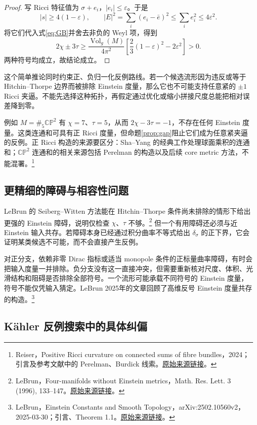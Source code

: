 \documentclass[11pt,a4paper]{article}
\theoremstyle{definition}
\newcommand{\Vol}{\operatorname{Vol}}
\newcommand{\src}[3]{\footnote{\raggedright #1，#2。\href{#3}{原始来源链接}。}}
\begin{document}
\begin{proof}
写 Ricci 特征值为 $\sigma+e_i$，$|e_i|\le\varepsilon$。于是
\[
|s|\ge4(1-\varepsilon),\qquad
|E|^2=\sum_i(e_i-\bar e)^2\le\sum_i e_i^2\le4\varepsilon^2.
\]
将它们代入式\eqref{eq:GB}并舍去非负的 Weyl 项，得到
\[
2\chi\pm3\tau\ge\frac{\Vol_g(M)}{4\pi^2}
\left[\frac23(1-\varepsilon)^2-2\varepsilon^2\right]>0.
\]
两种符号均成立，故结论成立。
\end{proof}

这个简单推论同时约束正、负归一化反例路线。若一个候选流形因为违反或等于 Hitchin--Thorpe 边界而被排除 Einstein 度量，那么它也不可能支持任意紧的 $\pm1$ Ricci 夹逼。不能先选择这种拓扑，再假定通过优化或缩小拼接尺度总能把相对误差降到零。

例如 $M=\#_5\mathbb{CP}^2$ 有 $\chi=7$、$\tau=5$，从而 $2\chi-3\tau=-1$，不存在任何 Einstein 度量。这类连通和可具有正 Ricci 度量，但命题\ref{prop:gap}阻止它们成为任意紧夹逼的反例。正 Ricci 构造的来源要区分：Sha--Yang 的经典工作处理球面乘积的连通和；$\mathbb{CP}^2$ 连通和的相关来源包括 Perelman 的构造以及后续 core metric 方法，不能混署。\src{Reiser}{Positive Ricci curvature on connected sums of fibre bundles，2024；引言及参考文献中的 Perelman、Burdick 线索}{https://arxiv.org/abs/2406.02274}

\subsection{更精细的障碍与相容性问题}

LeBrun 的 Seiberg--Witten 方法能在 Hitchin--Thorpe 条件尚未排除的情形下给出更强的 Einstein 障碍，说明仅检查 $\chi$、$\tau$ 不够。\src{LeBrun}{Four-manifolds without Einstein metrics，Math. Res. Lett. 3 (1996), 133--147}{https://arxiv.org/abs/dg-ga/9511015}
但一个有用障碍还必须与近 Einstein 输入共存。若障碍本身已经通过积分曲率不等式给出 $\delta_\sigma$ 的正下界，它会证明某类候选不可能，而不会直接产生反例。

对正分支，依赖非零 Dirac 指标或适当 monopole 条件的正标量曲率障碍，有时会把输入度量一并排除。负分支没有这一直接冲突，但需要重新核对尺度、体积、光滑结构和阻碍是否排除全部符号。一个流形可能承载不同符号的 Einstein 度量，符号不能仅凭输入猜定。LeBrun 2025年的文章回顾了高维反号 Einstein 度量共存的构造。\src{LeBrun}{Einstein Constants and Smooth Topology，arXiv:2502.10560v2，2025-03-30；引言、Theorem 1.1}{https://arxiv.org/abs/2502.10560v2}

\subsection{Kähler 反例搜索中的具体纠偏}
\end{document}
